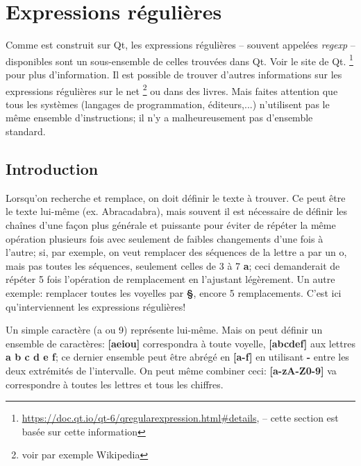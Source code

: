 
\chapter{Expressions r{\'e}guli{\`e}res}
\label{sec:regexp}

Comme \Tw{} est construit sur Qt, les expressions régulières -- souvent appelées \emph{regexp} -- disponibles sont un sous-ensemble de celles trouvées dans Qt. Voir le site de Qt.
\footnote{\label{fn.regexpQt}\url{https://doc.qt.io/qt-6/qregularexpression.html#details}, -- cette section est basée sur cette information} pour plus d'information. Il est possible de trouver d'autres informations sur les expressions régulières sur le net \footnote{voir par exemple Wikipedia} ou dans des livres. Mais faites attention que tous les systèmes (langages de programmation, éditeurs,...) n'utilisent pas le même ensemble d'instructions; il n'y a malheureusement pas \og d'ensemble standard\fg.

\section{Introduction}

Lorsqu'on recherche et remplace, on doit définir le texte à trouver. Ce peut être le texte lui-même (ex. \og Abracadabra\fg), mais souvent il est nécessaire de définir les chaînes d'une façon plus générale et puissante pour éviter de répéter la même opération plusieurs fois avec seulement de faibles changements d'une fois à l'autre; si, par exemple, on veut remplacer des séquences de la lettre \og a\fg{} par un \og o\fg{}, mais pas toutes les séquences, seulement celles de 3 à 7 \textbf{a}; ceci demanderait de répéter 5 fois l'opération de remplacement en l'ajustant légèrement. Un autre exemple: remplacer toutes les voyelles par \textbf{§}, encore 5 remplacements. C'est ici qu'interviennent les expressions régulières!

Un simple caractère (a ou 9) représente lui-même. Mais on peut définir un ensemble de caractères: \textbf{[aeiou]} correspondra à toute voyelle, \textbf{[abcdef]} aux lettres \textbf{a b c d e f}; ce dernier ensemble peut être abrégé en \textbf{[a-f]} en utilisant \og\textbf{-}\fg{} entre les deux extrémités de l'intervalle. On peut même combiner ceci: \textbf{[a-zA-Z0-9]} va correspondre à toutes les lettres et tous les chiffres.

